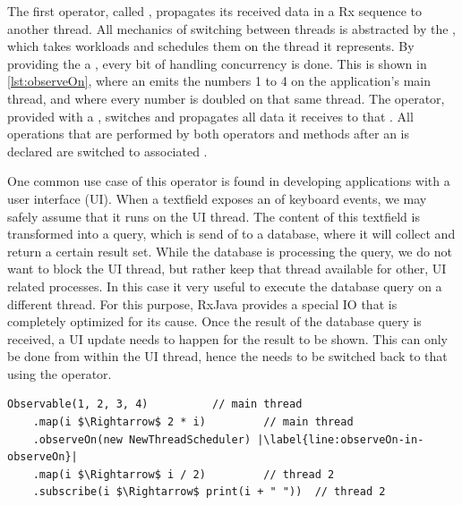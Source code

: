 The first operator, called , propagates its received data in a Rx sequence to another thread. All mechanics of switching between threads is abstracted by the \sch, which takes workloads and schedules them on the thread it represents. By providing the  a \sch, every bit of handling concurrency is done. This is shown in \autoref{lst:observeOn}, where an \obs emits the numbers 1 to 4 on the application's main thread, and where every number is doubled on that same thread. The  operator, provided with a , switches and propagates all data it receives to that \sch. All operations that are performed by both operators and  methods after an  is declared are switched to associated \sch.

One common use case of this operator is found in developing applications with a user interface (UI). When a textfield exposes an \obs of keyboard events, we may safely assume that it runs on the UI thread. The content of this textfield is transformed into a query, which is send of to a database, where it will collect and return a certain result set. While the database is processing the query, we do not want to block the UI thread, but rather keep that thread available for other, UI related processes. In this case it very useful to execute the database query on a different thread. For this purpose, RxJava provides a special IO \sch that is completely optimized for its cause. Once the result of the database query is received, a UI update needs to happen for the result to be shown. This can only be done from within the UI thread, hence the \obs needs to be switched back to that \sch using the  operator.

\begin{minipage}{\linewidth}
\begin{lstlisting}[style=ScalaStyle, caption={\code{observeOn} in a Rx sequence}, label={lst:observeOn}]
Observable(1, 2, 3, 4)			// main thread
    .map(i $\Rightarrow$ 2 * i)			// main thread
    .observeOn(new NewThreadScheduler) |\label{line:observeOn-in-observeOn}|
    .map(i $\Rightarrow$ i / 2)			// thread 2
    .subscribe(i $\Rightarrow$ print(i + " "))	// thread 2
\end{lstlisting}
\end{minipage}

